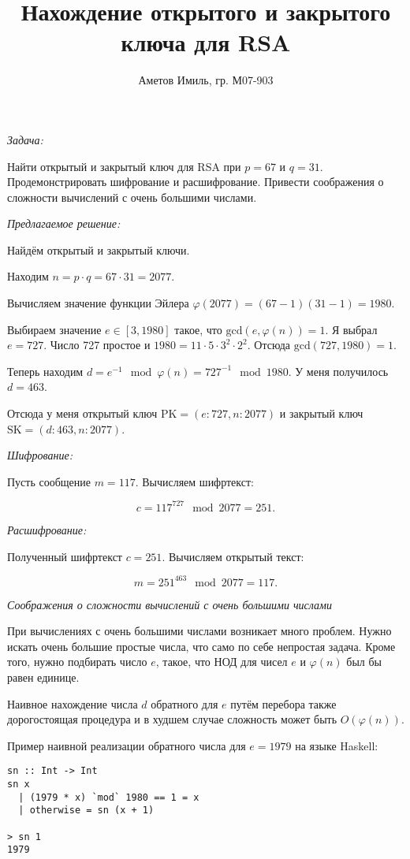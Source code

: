 \documentclass[10pt]{article}
\author{Аметов Имиль, гр. М07-903}
\title{Нахождение открытого и закрытого ключа для RSA}
\begin{document}
\maketitle

\emph{Задача:}

Найти открытый и закрытый ключ для RSA при $p = 67$ и $q = 31$. Продемонстрировать шифрование и расшифрование. Привести соображения о сложности вычислений с очень большими числами.

\emph{Предлагаемое решение:}

Найдём открытый и закрытый ключи.

Находим $n = p \cdot q = 67 \cdot 31 = 2077$.

Вычисляем значение функции Эйлера $\varphi (2077) = (67 - 1)(31 - 1) = 1980$.

Выбираем значение $e \in [3, 1980]$ такое, что $\text{gcd} (e, \varphi(n)) = 1$. Я выбрал $e = 727$. Число 727 простое и $1980 = 11 \cdot 5 \cdot 3^2 \cdot 2^2$. Отсюда $\text{gcd} (727, 1980) = 1$.

Теперь находим $d = e^{-1} \mod \varphi(n) = 727^{-1} \mod 1980$. У меня получилось $d = 463$.

Отсюда у меня открытый ключ $\text{PK} = (e : 727, n : 2077)$ и закрытый ключ $\text{SK} = (d : 463, n : 2077)$.

\emph{Шифрование:}

Пусть сообщение $m = 117$. Вычисляем шифртекст:

$$c = 117^{727} \mod 2077 = 251.$$

\emph{Расшифрование:}

Полученный шифртекст $c = 251$. Вычисляем открытый текст:

$$m = 251^{463} \mod 2077 = 117.$$

\emph{Соображения о сложности вычислений с очень большими числами}

При вычислениях с очень большими числами возникает много проблем. Нужно искать очень большие простые числа, что само по себе непростая задача. Кроме того, нужно подбирать число $e$, такое, что НОД для чисел $e$ и $\varphi (n)$ был бы равен единице.

Наивное нахождение числа $d$ обратного для $e$ путём перебора также дорогостоящая процедура и в худшем случае сложность может быть $O(\varphi(n))$.

Пример наивной реализации обратного числа для $e = 1979$ на языке Haskell:

\begin{verbatim}
sn :: Int -> Int
sn x
  | (1979 * x) `mod` 1980 == 1 = x
  | otherwise = sn (x + 1)

> sn 1
1979
\end{verbatim}
\end{document}
